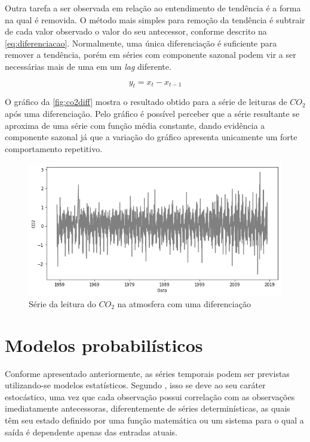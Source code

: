 \documentclass[
    12pt,
    oneside,
    a4paper,
    english,
    brazil
]{abntex2}
\begin{document}
Outra tarefa a ser observada em relação  ao entendimento de tendência é a forma
na qual é removida. O método mais  simples para remoção da tendência é subtrair
de  cada valor  observado  o  valor do  seu  antecessor,  conforme descrito  na
\autoref{eq:diferenciacao}. Normalmente,  uma única diferenciação  é suficiente
para remover  a tendência, porém em  séries com componente sazonal  podem vir a
ser necessárias mais de uma em um \textit{lag} diferente.

\begin{equation}
    \label{eq:diferenciacao}
    y_t = x_t - x_{t-1}
\end{equation}


O gráfico  da \autoref{fig:co2diff} mostra o  resultado obtido para a  série de
leituras de $CO_2$ após uma diferenciação. Pelo gráfico é possível perceber que
a série resultante  se aproxima de uma série com  função média constante, dando
evidência  a  componente  sazonal  já  que  a  variação  do  gráfico  apresenta
unicamente um forte comportamento repetitivo.

\begin{figure}[ht]
    \centering
    \caption{Série da leitura do $CO_2$ na atmosfera com uma
        diferenciação}\label{fig:co2diff}
    \includegraphics[width=.5\linewidth]{images/co2_diff.png}
\end{figure}

\section{Modelos probabilísticos}

Conforme  apresentado anteriormente,  as séries  temporais podem  ser previstas
utilizando-se modelos  estatísticos. Segundo , isso  se deve
ao  seu caráter  estocástico, uma  vez  que cada  observação possui  correlação
com  as  observações  imediatamente   antecessoras,  diferentemente  de  séries
determinísticas, as quais têm seu estado  definido por uma função matemática ou
um sistema para o qual a saída é dependente apenas das entradas atuais.
\end{document}
